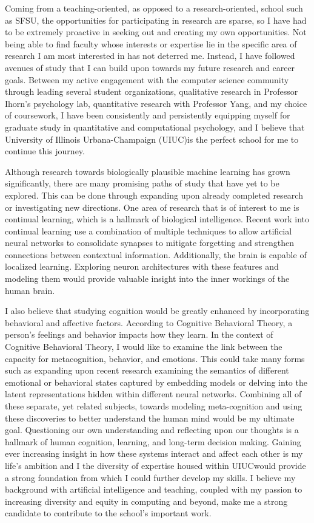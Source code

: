 \documentclass[12pt]{article}
\newcommand{\school}{University of Illinois Urbana-Champaign (UIUC)}
\newcommand{\abbrschool}{UIUC}
\begin{document}
Coming from a teaching-oriented, as opposed to a research-oriented, school such as SFSU, the opportunities for participating in research are
sparse, so I have had to be extremely proactive in seeking out and creating my own opportunities.  Not being able to find faculty
whose interests or expertise lie in the specific area of research I am most interested in has not deterred me.  Instead, I have followed
avenues of study that I can build upon towards my future research and career goals.  Between my active engagement with the computer science
community through leading several student organizations, qualitative research in Professor Ihorn's psychology lab, quantitative research
with Professor Yang, and my choice of coursework, I have been consistently and persistently equipping myself for graduate study in
quantitative and computational psychology, and I believe that \school is the perfect school for me to continue this journey.

Although research towards biologically plausible machine learning has grown significantly, there are many promising paths of study that
have yet to be explored.  This can be done through expanding upon already completed research or investigating new directions.  One
area of research that is of interest to me is continual learning, which is a hallmark of biological intelligence.  Recent work
into continual learning use a combination of multiple techniques to allow artificial neural networks to consolidate synapses to mitigate
forgetting and strengthen connections between contextual information.  Additionally, the brain is capable of localized learning.
Exploring neuron architectures with these features and modeling them would provide valuable insight into the inner workings of the
human brain.

I also believe that studying cognition would be greatly enhanced by incorporating behavioral and affective factors.  According to
Cognitive Behavioral Theory, a person's feelings and behavior impacts how they learn.  In the context of Cognitive Behavioral Theory, I would
like to examine the link between the capacity for metacognition, behavior, and emotions.  This could take many forms such as expanding upon
recent research examining the semantics of different emotional or behavioral states captured by embedding models or delving into the latent
representations hidden within different neural networks.  Combining all of these separate, yet related subjects, towards modeling
meta-cognition and using these discoveries to better understand the human mind would be my ultimate goal.  Questioning our own understanding
and reflecting upon our thoughts is a hallmark of human cognition, learning, and long-term decision making.  Gaining ever increasing insight
in how these systems interact and affect each other is my life's ambition and I the diversity of expertise housed within \abbrschool would
provide a strong foundation from which I could further develop my skills. I believe my background with artificial intelligence and teaching,
coupled with my passion to increasing diversity and equity in computing and beyond, make me a strong candidate to contribute to the school's
important work.
\end{document}
